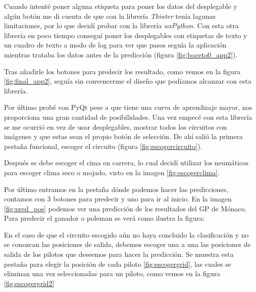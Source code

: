 Cuando intenté poner alguna etiqueta para poner los datos del desplegable y algún botón me di cuenta de que con la librería \textit{Tkinter} tenía lagunas limitaciones, por lo que decidí probar con la librería \textit{wxPython}. Con esta otra librería en poco tiempo conseguí poner los desplegables con etiquetas de texto y un cuadro de texto a modo de log para ver que pasos seguía la aplicación mientras trataba los datos antes de la predicción (figura \ref{fig:boceto0_app2}).


Tras añadirle los botones para predecir los resultado, como vemos en la figura \ref{fig:final_app2}, seguía sin convencerme el diseño que podíamos alcanzar con esta librería.


Por último probé con PyQt pese a que tiene una curva de aprendizaje mayor, nos proporciona una gran cantidad de posibilidades. Una vez empecé con esta librería se me ocurrió en vez de usar desplegables, mostrar todos los circuitos con imágenes y que estas sean el propio botón de selección. De ahí salió la primera pestaña funcional, escoger el circuito (figura \ref{fig:escogercircuito}).


Después se debe escoger el cima en carrera, lo cual decidí utilizar los neumáticos para escoger clima seco o mojado, visto en la imagen \ref{fig:escogerclima}.


Por último entramos en la pestaña dónde podemos hacer las predicciones, contamos con 3 botones para predecir y uno para ir al inicio. En la imagen \ref{fig:pred_pos} podemos ver una predicción de los resultados del GP de Mónaco. Para predecir el ganador o poleman se verá como ilustra la figura: 



En el caso de que el circuito escogido aún no haya concluido la clasificación y no se conozcan las posiciones de salida, debemos escoger una a una las posiciones de salida de los pilotos que deseemos para hacer la predicción. Se muestra esta pestaña para elegir la posición de cada piloto \ref{fig:escogergrid}, las cuales se eliminan una vez seleccionadas para un piloto, como vemos en la figura \ref{fig:escogergrid2}

